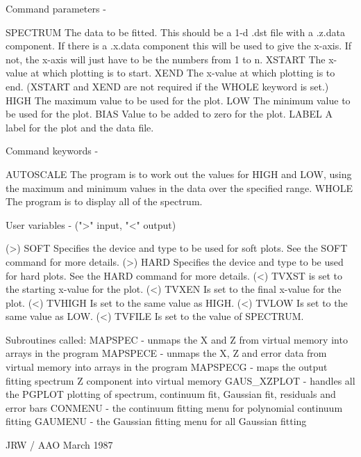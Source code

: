 \begin{description}
\begin{description}
\begin{terminalv}
 Command parameters -

 SPECTRUM    The data to be fitted. This should be a
             1-d .dst file with a .z.data component.  If there
             is a .x.data component this will be used to
             give the x-axis.  If not, the x-axis will just
             have to be the numbers from 1 to n.
 XSTART      The x-value at which plotting is to start.
 XEND        The x-value at which plotting is to end.
             (XSTART and XEND are not required if the
             WHOLE keyword is set.)
 HIGH        The maximum value to be used for the plot.
 LOW         The minimum value to be used for the plot.
 BIAS        Value to be added to zero for the plot.
 LABEL       A label for the plot and the data file.

 Command keywords -

 AUTOSCALE   The program is to work out the values for HIGH
             and LOW, using the maximum and minimum values
             in the data over the specified range.
 WHOLE       The program is to display all of the spectrum.

 User variables -    (">" input, "<" output)

 (>) SOFT    Specifies the device and type to be used for soft
             plots.  See the SOFT command for more details.
 (>) HARD    Specifies the device and type to be used for hard
             plots.  See the HARD command for more details.
 (<) TVXST   is set to the starting x-value for the plot.
 (<) TVXEN   Is set to the final x-value for the plot.
 (<) TVHIGH  Is set to the same value as HIGH.
 (<) TVLOW   Is set to the same value as LOW.
 (<) TVFILE  Is set to the value of SPECTRUM.

 Subroutines called:
   MAPSPEC  -  unmaps the X and Z from virtual memory into arrays
               in the program
   MAPSPECE  -  unmaps the X, Z and error data from virtual memory
                into arrays in the program
   MAPSPECG  - maps the output fitting spectrum Z component into
               virtual memory
   GAUS_XZPLOT  -  handles all the PGPLOT plotting of spectrum,
                   continuum fit, Gaussian fit, residuals and
                   error bars
   CONMENU  -  the continuum fitting menu for polynomial continuum
               fitting
   GAUMENU  -  the Gaussian fitting menu for all Gaussian fitting

                                      JRW / AAO March 1987
\end{terminalv}
\end{description}

\end{description}
